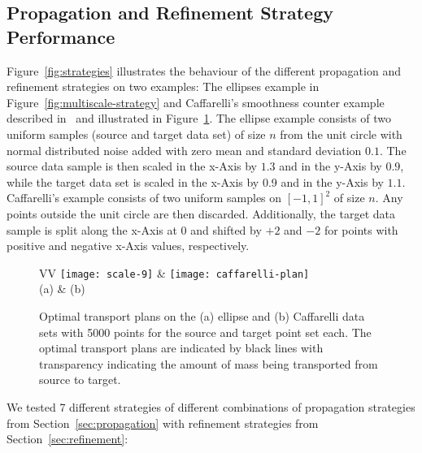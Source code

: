 \documentclass[twoside,11pt]{article}
\begin{document}
\subsection{Propagation and Refinement Strategy Performance}
Figure~\ref{fig:strategies} illustrates the behaviour of the different
propagation and refinement strategies on two examples: The ellipses example in
Figure~\ref{fig:multiscale-strategy} and Caffarelli's smoothness counter example
described in~\citet[Chapter~12]{villani:book2009} and illustrated in
Figure~\ref{fig:datasets}. The ellipse example consists of two uniform samples
(source and target data set) of size $n$ from the unit circle with normal
distributed noise added with zero mean and standard deviation $0.1$. The source
data sample is then scaled in the x-Axis by $1.3$ and in the y-Axis by $0.9$,
while the target data set is scaled in the x-Axis
by 0.9 and in the y-Axis by $1.1$. 
Caffarelli's example consists of two uniform samples on $[-1,1]^2$ of size $n$.
Any points outside the unit circle are then discarded. Additionally, the target
data sample is split along the x-Axis at $0$ and shifted by $+2$ and $-2$ for
points with positive and negative x-Axis values, respectively. 
\begin{figure}[htb]
\centering
\begin{tabular}{VV}
\texttt{[image: scale-9]} & 
\texttt{[image: caffarelli-plan]}\\
                      (a) & (b)  
\end{tabular}
\vspace{-0.2in}
\caption{
\label{fig:datasets}
Optimal transport plans on the (a) ellipse and (b) Caffarelli data sets with
5000 points for the source and target point set each. The optimal transport
plans are indicated by black lines with transparency indicating the amount of
mass being transported from source to target. } 
\end{figure}
\vspace{-0.2in}
We tested 7 different strategies of different combinations of propagation
strategies from Section~\ref{sec:propagation} with refinement strategies from
Section~\ref{sec:refinement}:
\end{document}
